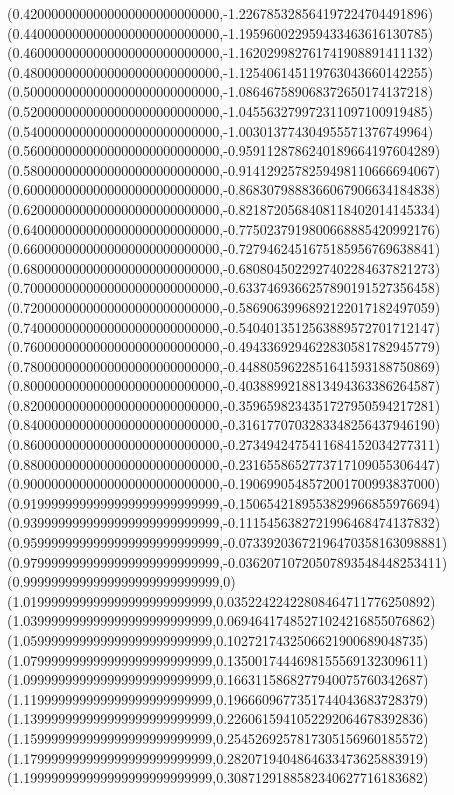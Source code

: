 \documentclass[11pt]{report}
\begin{document}
\begin{center}
  (0.4200000000000000000000000000,-1.226785328564197224704491896)
  (0.4400000000000000000000000000,-1.195960022959433463616130785)
  (0.4600000000000000000000000000,-1.162029982761741908891411132)
  (0.4800000000000000000000000000,-1.125406145119763043660142255)
  (0.5000000000000000000000000000,-1.086467589068372650174137218)
  (0.5200000000000000000000000000,-1.045563279972311097100919485)
  (0.5400000000000000000000000000,-1.003013774304955571376749964)
  (0.5600000000000000000000000000,-0.9591128786240189664197604289)
  (0.5800000000000000000000000000,-0.9141292578259498110666694067)
  (0.6000000000000000000000000000,-0.8683079888366067906634184838)
  (0.6200000000000000000000000000,-0.8218720568408118402014145334)
  (0.6400000000000000000000000000,-0.7750237919800668885420992176)
  (0.6600000000000000000000000000,-0.7279462451675185956769638841)
  (0.6800000000000000000000000000,-0.6808045022927402284637821273)
  (0.7000000000000000000000000000,-0.6337469366257890191527356458)
  (0.7200000000000000000000000000,-0.5869063996892122017182497059)
  (0.7400000000000000000000000000,-0.5404013512563889572701712147)
  (0.7600000000000000000000000000,-0.4943369294622830581782945779)
  (0.7800000000000000000000000000,-0.4488059622851641593188750869)
  (0.8000000000000000000000000000,-0.4038899218813494363386264587)
  (0.8200000000000000000000000000,-0.3596598234351727950594217281)
  (0.8400000000000000000000000000,-0.3161770703283348256437946190)
  (0.8600000000000000000000000000,-0.2734942475411684152034277311)
  (0.8800000000000000000000000000,-0.2316558652773717109055306447)
  (0.9000000000000000000000000000,-0.1906990548572001700993837000)
  (0.9199999999999999999999999999,-0.1506542189553829966855976694)
  (0.9399999999999999999999999999,-0.1115456382721996468474137832)
  (0.9599999999999999999999999999,-0.07339203672196470358163098881)
  (0.9799999999999999999999999999,-0.03620710720507893548448253411)
  (0.9999999999999999999999999999,0)
  (1.019999999999999999999999999,0.03522422422808464711776250892)
  (1.039999999999999999999999999,0.06946417485271024216855076862)
  (1.059999999999999999999999999,0.1027217432506621900689048735)
  (1.079999999999999999999999999,0.1350017444698155569132309611)
  (1.099999999999999999999999999,0.1663115868277940075760342687)
  (1.119999999999999999999999999,0.1966609677351744043683728379)
  (1.139999999999999999999999999,0.2260615941052292064678392836)
  (1.159999999999999999999999999,0.2545269257817305156960185572)
  (1.179999999999999999999999999,0.2820719404864633473625883919)
  (1.199999999999999999999999999,0.3087129188582340627716183682)

\end{center}
\end{document}

